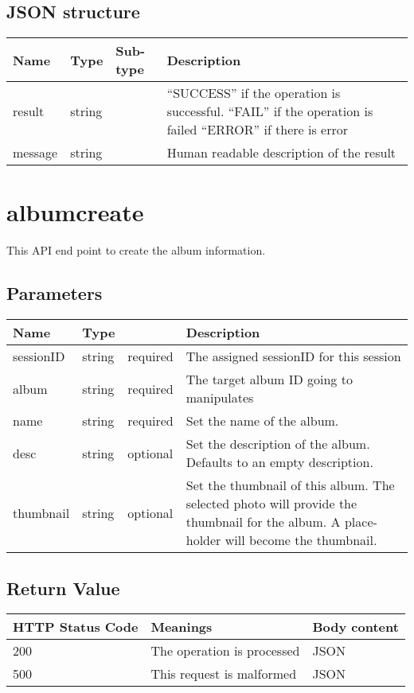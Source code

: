 \documentclass[a4paper,12pt]{report}
\begin{document}
	\subsection{JSON structure}
	\begin{tabular}{|l|l|l|p{10cm}|}
		\hline
		Name & Type & Sub-type & Description\\\hline
		result & string & & ``SUCCESS'' if the operation is successful.\newline
		``FAIL'' if the operation is failed\newline
		``ERROR'' if there is error\\\hline
		message & string & & Human readable description of the result\\\hline
	\end{tabular}
	\section{albumcreate}
	This API end point to create the album information.
	\subsection{Parameters}
	\begin{tabular}{|l|ll|p{10cm}|}
		\hline
		Name & Type & & Description\\\hline
		sessionID & string & required & The assigned sessionID for this session\\\hline
		album & string & required & The target album ID going to manipulates\\\hline
		name & string & required & Set the name of the album. \\\hline
		desc & string & optional & Set the description of the album. Defaults to an empty description.\\\hline
		thumbnail & string& optional & Set the thumbnail of this album. The selected photo will provide the thumbnail for the album. A place-holder will become the thumbnail. \\\hline
	\end{tabular}
	\subsection{Return Value}
	\begin{tabular}{|l|p{10cm}|l|}
		\hline
		HTTP Status Code & Meanings & Body content  \\\hline
		200 & The operation is processed & JSON\\\hline
		500 & This request is malformed & JSON\\\hline
	\end{tabular}
\end{document}
